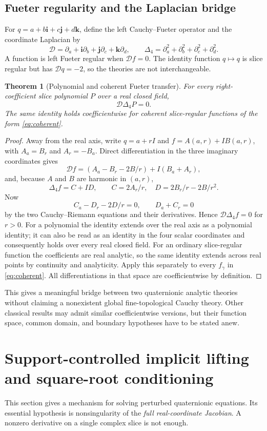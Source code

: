 \documentclass[11pt,letterpaper]{article}
\newtheorem{theorem}{Theorem}[section]
\theoremstyle{definition}
\newcommand{\ii}{\mathbf i}
\newcommand{\jj}{\mathbf j}
\newcommand{\kk}{\mathbf k}
\begin{document}
\subsection{Fueter regularity and the Laplacian bridge}
For $q=a+b\ii+c\jj+d\kk$, define the left Cauchy--Fueter operator and the
coordinate Laplacian by
\[
 \mathcal D=\partial_a+\ii\partial_b+\jj\partial_c+\kk\partial_d,
 \qquad \Delta_4=\partial_a^2+\partial_b^2+\partial_c^2+\partial_d^2.
\]
A function is left Fueter regular when $\mathcal Df=0$. The identity function
$q\mapsto q$ is slice regular but has $\mathcal Dq=-2$, so the theories are
not interchangeable.

\begin{theorem}[Polynomial and coherent Fueter transfer]
\label{thm:fueter}
For every right-coefficient slice polynomial $P$ over a real closed field,
\[
 \mathcal D\Delta_4 P=0.
\]
The same identity holds coefficientwise for coherent slice-regular functions
of the form \eqref{eq:coherent}.
\end{theorem}
\begin{proof}
Away from the real axis, write $q=a+rI$ and $f=A(a,r)+IB(a,r)$, with
$A_a=B_r$ and $A_r=-B_a$. Direct differentiation in the three imaginary
coordinates gives
\[
 \mathcal Df=(A_a-B_r-2B/r)+I(B_a+A_r),
\]
and, because $A$ and $B$ are harmonic in $(a,r)$,
\[
 \Delta_4 f=C+ID,\qquad
 C=2A_r/r,\quad D=2B_r/r-2B/r^2.
\]
Now
\[
 C_a-D_r-2D/r=0,\qquad D_a+C_r=0
\]
by the two Cauchy--Riemann equations and their derivatives. Hence
$\mathcal D\Delta_4 f=0$ for $r>0$. For a polynomial the identity extends over
the real axis as a polynomial identity; it can also be read as an identity in
the four scalar coordinates and consequently holds over every real closed
field. For an ordinary slice-regular function the coefficients are real
analytic, so the same identity extends across real points by continuity and
analyticity. Apply this separately to every $f_\gamma$ in \eqref{eq:coherent}.
All differentiations in that space are coefficientwise by definition.
\end{proof}
This gives a meaningful bridge between two quaternionic analytic theories
without claiming a nonexistent global fine-topological Cauchy theory. Other
classical results may admit similar coefficientwise versions, but their
function space, common domain, and boundary hypotheses have to be stated anew.

\section{Support-controlled implicit lifting and square-root conditioning}
\label{sec:lifting}
This section gives a mechanism for solving perturbed quaternionic equations.
Its essential hypothesis is nonsingularity of the \emph{full real-coordinate
Jacobian}. A nonzero derivative on a single complex slice is not enough.
\end{document}
